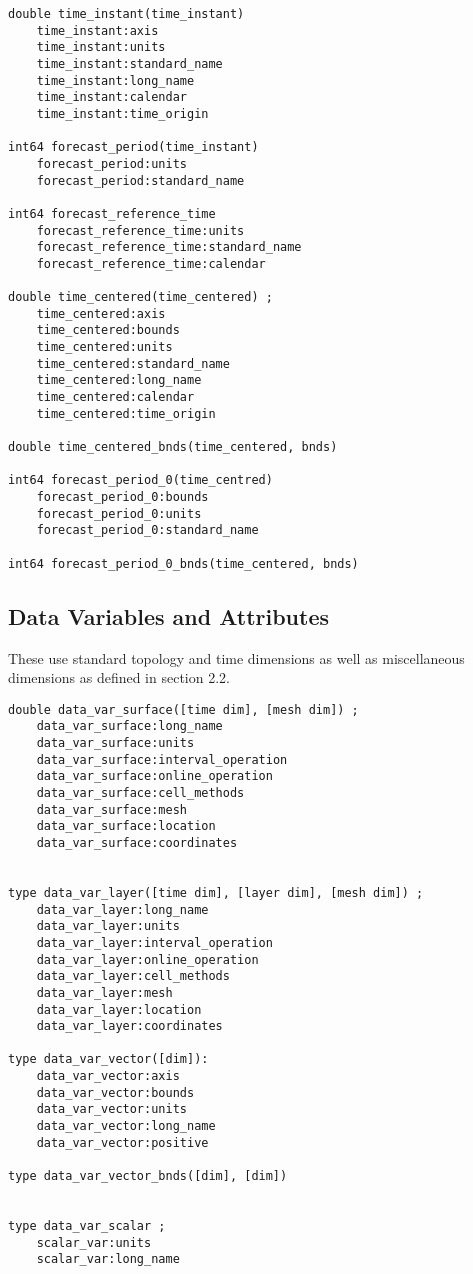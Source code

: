 \begin{verbatim}
double time_instant(time_instant)
    time_instant:axis
    time_instant:units
    time_instant:standard_name
    time_instant:long_name
    time_instant:calendar
    time_instant:time_origin

int64 forecast_period(time_instant)
    forecast_period:units
    forecast_period:standard_name

int64 forecast_reference_time
    forecast_reference_time:units
    forecast_reference_time:standard_name
    forecast_reference_time:calendar

double time_centered(time_centered) ;
    time_centered:axis
    time_centered:bounds
    time_centered:units
    time_centered:standard_name
    time_centered:long_name
    time_centered:calendar
    time_centered:time_origin

double time_centered_bnds(time_centered, bnds)

int64 forecast_period_0(time_centred)
    forecast_period_0:bounds
    forecast_period_0:units
    forecast_period_0:standard_name

int64 forecast_period_0_bnds(time_centered, bnds)
\end{verbatim}

\subsection{Data Variables and Attributes}

These use standard topology and time dimensions as well as miscellaneous dimensions as 
defined in section 2.2. 

\begin{verbatim}
double data_var_surface([time dim], [mesh dim]) ;
    data_var_surface:long_name
    data_var_surface:units
    data_var_surface:interval_operation
    data_var_surface:online_operation
    data_var_surface:cell_methods
    data_var_surface:mesh
    data_var_surface:location
    data_var_surface:coordinates


type data_var_layer([time dim], [layer dim], [mesh dim]) ;
    data_var_layer:long_name
    data_var_layer:units
    data_var_layer:interval_operation
    data_var_layer:online_operation
    data_var_layer:cell_methods
    data_var_layer:mesh
    data_var_layer:location
    data_var_layer:coordinates

type data_var_vector([dim]):
    data_var_vector:axis
    data_var_vector:bounds
    data_var_vector:units
    data_var_vector:long_name
    data_var_vector:positive

type data_var_vector_bnds([dim], [dim])


type data_var_scalar ;
    scalar_var:units
    scalar_var:long_name
\end{verbatim}


